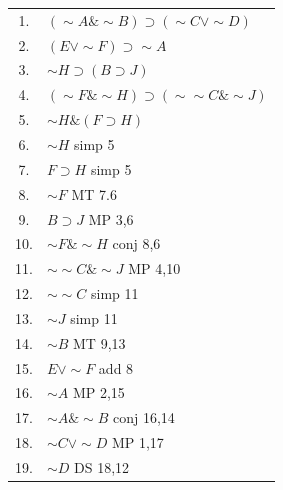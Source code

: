 \documentclass[11pt, fleqn]{article}
\begin{document}
\begin{tabular}{cl}
    1. & $(\sim A\&\sim B)\supset(\sim C\vee \sim D)$\\
    2. & $(E\vee \sim F)\supset \sim A$\\
    3. & $\sim H\supset(B\supset J)$\\
    4. & $(\sim F\&\sim H)\supset(\sim\sim C\& \sim J)$\\
    5. & $\sim H\&(F\supset H)$\\
    \hline
    6. & $\sim H$ simp 5\\
    7. & $F\supset H$ simp 5\\
    8. & $\sim F$ MT 7.6\\
    9. & $B\supset J$ MP 3,6\\
    10. & $\sim F\&\sim H$ conj 8,6\\
    11. & $\sim\sim C\&\sim J$ MP 4,10\\
    12. & $\sim\sim C$ simp 11\\
    13. & $\sim J$ simp 11\\
    14. & $\sim B$ MT 9,13\\
    15. & $E\vee \sim F$ add 8\\
    16. & $\sim A$ MP 2,15\\
    17. & $\sim A\&\sim B$ conj 16,14\\
    18. & $\sim C\vee \sim D$ MP 1,17\\
    19. & $\sim D$ DS 18,12
\end{tabular}\\
\end{document}
